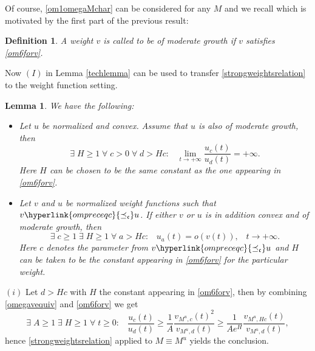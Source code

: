 \documentclass[10pt]{amsart}%
\numberwithin{equation}{section}
\theoremstyle{plain}
\newtheorem{lemma}[proposition]{Lemma}
\newtheorem{definition}[proposition]{Definition}
\begin{document}
Of course, \eqref{om1omegaMchar} can be considered for any $M$ and we recall \cite[Def. 2.18]{weightedentirecharacterization} which is motivated by the first part of the previous result:

\begin{definition}\label{admissdef1}
A weight $v$ is called to be of \emph{moderate growth} if $v$ satisfies \eqref{om6forv}.
\end{definition}

Now $(I)$ in Lemma \ref{techlemma} can be used to transfer \eqref{strongweightsrelation} to the weight function setting.

\begin{lemma}\label{strongweightsrelationforvlem}
We have the following:
\begin{itemize}
\item[$(i)$] Let $u$ be normalized and convex. Assume that $u$ is also of moderate growth, then
\begin{equation}\label{strongweightsrelationforv}
\exists\;H\ge 1\;\forall\;c>0\;\forall\;d>Hc:\;\;\;\lim_{t\rightarrow+\infty}\frac{u_c(t)}{u_d(t)}=+\infty.
\end{equation}
Here $H$ can be chosen to be the same constant as the one appearing in \eqref{om6forv}.

\item[$(ii)$] Let $v$ and $u$ be normalized weight functions such that $v\hyperlink{ompreceqc}{\preceq_{\mathfrak{c}}}u$. If either $v$ or $u$ is in addition convex and of moderate growth, then
\begin{equation}\label{charactabstractweightcorequ}
\exists\;c\ge 1\;\exists\;H\ge 1\;\forall\;a>Hc:\;\;\;u_{a}(t)=o(v(t)),\;\;\;t\rightarrow+\infty.
\end{equation}
Here $c$ denotes the parameter from $v\hyperlink{ompreceqc}{\preceq_{\mathfrak{c}}}u$ and $H$ can be taken to be the constant appearing in \eqref{om6forv} for the particular weight.
\end{itemize}
\end{lemma}

$(i)$ Let $d>Hc$ with $H$ the constant appearing in \eqref{om6forv}, then by combining \eqref{omegavequiv} and \eqref{om6forv} we get
$$\exists\;A\ge 1\;\exists\;H\ge 1\;\forall\;t\ge 0:\;\;\;\frac{u_c(t)}{u_d(t)}\ge\frac{1}{A}\frac{v_{{M^u},c}(t)^2}{v_{{M^u},d}(t)}\ge\frac{1}{Ae^H}\frac{v_{{M^u},Hc}(t)}{v_{{M^u},d}(t)},$$
hence \eqref{strongweightsrelation} applied to $M\equiv M^u$ yields the conclusion.\vspace{6pt}
\end{document}
